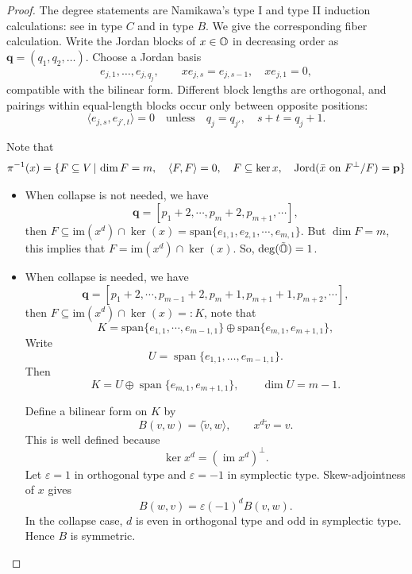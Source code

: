 \begin{proof}
  The degree statements are Namikawa's type I and type II
  induction calculations: see
  \cite[Claims~2.3.1--2.3.2]{Namikawa2022Cover} in type $C$ and
  \cite[Claims~3.6.1--3.6.2]{Namikawa2022Cover} in type $B$.
  We give the corresponding fiber calculation.
  Write the Jordan blocks of \(x \in \mathbb{O}\) in decreasing order as \(\mathbf q=(q_1,q_2,\ldots)\). Choose a Jordan basis
\[
e_{j,1},\ldots,e_{j,q_j},
\qquad
xe_{j,s}=e_{j,s-1},\quad xe_{j,1}=0,
\]
compatible with the bilinear form. Different block lengths are orthogonal, and pairings within equal-length blocks occur only between opposite positions:
\[
\langle e_{j,s},e_{j',t}\rangle=0
\quad\text{unless}\quad
q_j=q_{j'},\quad s+t=q_j+1.
\]

Note that
\[
  \pi^{-1}(x) = \{F \subseteq V\,|\,\dim F=m,\quad \left\langle F,F\right\rangle=0 ,\quad F\subseteq\ker x,\quad
\operatorname{Jord}(\bar x\text{ on }F^\perp/F)=\mathbf p\}
\]

  \begin{itemize}
    \item When collapse is not needed, we have 
          \[ \mathbf{q} = [p_1 +2, \cdots, p_m +2, p_{m+1}, \cdots], \]
          then $F \subseteq \mathrm{im}(x^d) \cap \ker(x) = \mathrm{span}\{e_{1,1}, e_{2,1}, \cdots, e_{m,1} \}$. But $\dim F = m$, this implies that $F = \mathrm{im}(x^d) \cap \ker(x)$. So, $\deg(\tilde{\mathbb{O}}) = 1$.
    \item When collapse is needed, we have
          \[ \mathbf{q} = [p_1 +2, \cdots, p_{m-1}+2,p_m +1, p_{m+1}+1, p_{m+2}, \cdots], \]
          then $F \subseteq \mathrm{im}(x^d) \cap \ker(x) =: K$, note that
          \[ K = \mathrm{span}\{e_{1,1}, \cdots, e_{m-1,1}\} \oplus \mathrm{span}\{e_{m,1}, e_{m+1,1}\}, \]
          Write
      \[
        U=\operatorname{span}
        \{e_{1,1},\ldots,e_{m-1,1}\}.
      \]
      Then
      \[
        K=
        U\oplus
        \operatorname{span}\{e_{m,1},e_{m+1,1}\},
        \qquad
        \dim U=m-1.
      \]

      Define a bilinear form on $K$ by
      \[
        B(v,w)=\langle\widetilde v,w\rangle,
        \qquad x^d\widetilde v=v.
      \]
      This is well defined because
      \[
        \ker x^d=(\operatorname{im}x^d)^\perp.
      \]
      Let $\varepsilon=1$ in orthogonal type and
      $\varepsilon=-1$ in symplectic type.
      Skew-adjointness of $x$ gives
      \[
        B(w,v)=\varepsilon(-1)^d B(v,w).
      \]
      In the collapse case, $d$ is even in orthogonal
      type and odd in symplectic type. Hence $B$ is symmetric.


\end{itemize}
\end{proof}
